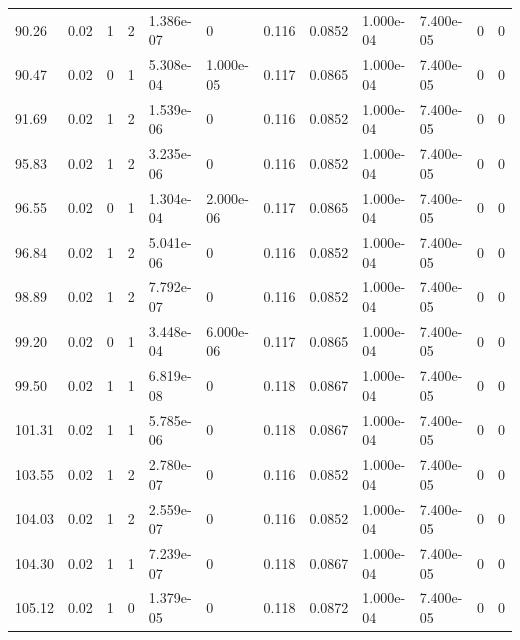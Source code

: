 \documentclass[preview]{standalone}
\begin{document}
{{{\begin{tabular}{L{1.2cm}C{1.2cm} C{0.3cm}C{0.5cm} C{1.4cm}C{1.4cm} C{1.4cm}C{1.4cm} C{1.6cm}C{1.6cm} C{1.6cm}C{1.6cm}}
  90.26  &  0.02  & 1     &  2 &  1.386e-07  & 0  &  0.116&   0.0852& 1.000e-04 & 7.400e-05   &  0 & 0  \\ 
  90.47  &  0.02  & 0     &  1 &  5.308e-04  & 1.000e-05  &  0.117&   0.0865& 1.000e-04 & 7.400e-05   &  0 & 0  \\ 
  91.69  &  0.02  & 1     &  2 &  1.539e-06  & 0  &  0.116&   0.0852& 1.000e-04 & 7.400e-05   &  0 & 0  \\ 
  95.83  &  0.02  & 1     &  2 &  3.235e-06  & 0  &  0.116&   0.0852& 1.000e-04 & 7.400e-05   &  0 & 0  \\ 
  96.55  &  0.02  & 0     &  1 &  1.304e-04  & 2.000e-06  &  0.117&   0.0865& 1.000e-04 & 7.400e-05   &  0 & 0  \\ 
  96.84  &  0.02  & 1     &  2 &  5.041e-06  & 0  &  0.116&   0.0852& 1.000e-04 & 7.400e-05   &  0 & 0  \\ 
  98.89  &  0.02  & 1     &  2 &  7.792e-07  & 0  &  0.116&   0.0852& 1.000e-04 & 7.400e-05   &  0 & 0  \\ 
  99.20  &  0.02  & 0     &  1 &  3.448e-04  & 6.000e-06  &  0.117&   0.0865& 1.000e-04 & 7.400e-05   &  0 & 0  \\ 
  99.50  &  0.02  & 1     &  1 &  6.819e-08  & 0  &  0.118&   0.0867& 1.000e-04 & 7.400e-05   &  0 & 0  \\ 
  101.31  &  0.02  & 1     &  1 &  5.785e-06  & 0  &  0.118&   0.0867& 1.000e-04 & 7.400e-05   &  0 & 0  \\ 
  103.55  &  0.02  & 1     &  2 &  2.780e-07  & 0  &  0.116&   0.0852& 1.000e-04 & 7.400e-05   &  0 & 0  \\ 
  104.03  &  0.02  & 1     &  2 &  2.559e-07  & 0  &  0.116&   0.0852& 1.000e-04 & 7.400e-05   &  0 & 0  \\ 
  104.30  &  0.02  & 1     &  1 &  7.239e-07  & 0  &  0.118&   0.0867& 1.000e-04 & 7.400e-05   &  0 & 0  \\ 
  105.12  &  0.02  & 1     &  0 &  1.379e-05  & 0  &  0.118&   0.0872& 1.000e-04 & 7.400e-05   &  0 & 0  \\ 
\hline 
\end{tabular} 

}}}
\end{document}
